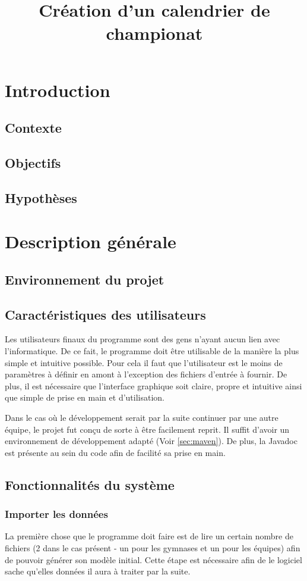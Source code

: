 \documentclass[final, noposter]{polytech/polytech}
\title{Création d'un calendrier de championat}
\begin{document}
\chapter{Introduction}
	\section{Contexte}
	\section{Objectifs}
	\section{Hypothèses}

\chapter{Description générale}	
	\section{Environnement du projet}
	\section{Caractéristiques des utilisateurs}
		Les utilisateurs finaux du programme sont des gens n'ayant aucun lien avec l'informatique. De ce fait, le programme doit être utilisable de la manière la plus simple et intuitive possible. Pour cela il faut que l'utilisateur est le moins de paramètres à définir en amont à l'exception des fichiers d'entrée à fournir. De plus, il est nécessaire que l'interface graphique soit claire, propre et intuitive ainsi que simple de prise en main et d'utilisation.
 		
		Dans le cas où le développement serait par la suite continuer par une autre équipe, le projet fut conçu de sorte à être facilement reprit. Il suffit d'avoir un environnement de développement adapté (Voir \autoref{sec:maven}). De plus, la Javadoc est présente au sein du code afin de facilité sa prise en main.

	\section{Fonctionnalités du système}
		\subsection{Importer les données}
			La première chose que le programme doit faire est de lire un certain nombre de fichiers (2 dans le cas présent - un pour les gymnases et un pour les équipes) afin de pouvoir générer son modèle initial. Cette étape est nécessaire afin de le logiciel sache qu'elles données il aura à traiter par la suite.
\end{document}
